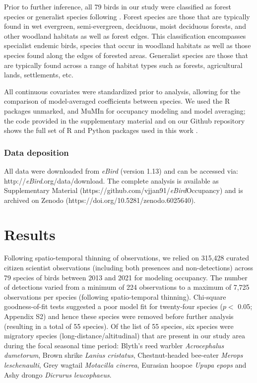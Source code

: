 Prior to further inference, all 79 birds in our study were classified as forest species or generalist species following \citep{ali1983}.
Forest species are those that are typically found in wet evergreen, semi-evergreen, deciduous, moist deciduous forests, and other woodland habitats as well as forest edges.
This classification encompasses specialist endemic birds, species that occur in woodland habitats as well as those species found along the edges of forested areas.
Generalist species are those that are typically found across a range of habitat types such as forests, agricultural lands, settlements, etc.

All continuous covariates were standardized prior to analysis, allowing for the comparison of model-averaged coefficients between species.
We used the R packages unmarked, and MuMIn for occupancy modeling and model averaging; the code provided in the supplementary material and on our Github repository shows the full set of R and Python packages used in this work \citep{barton2009,fiske2011,r2020}.

\subsubsection*{Data deposition}

All data were downloaded from \textit{eBird} (version 1.13) and can be accessed via: http://\textit{eBird}.org/data/download.
The complete analysis is available as Supplementary Material (https://github.com/vjjan91/\textit{eBird}Occupancy) and is archived on Zenodo (https://doi.org/10.5281/zenodo.6025640).

\section*{Results}

Following spatio-temporal thinning of observations, we relied on 315,428 curated citizen scientist observations (including both presences and non-detections) across 79 species of birds between 2013 and 2021 for modeling occupancy.
The number of detections varied from a minimum of 224 observations to a maximum of 7,725 observations per species (following spatio-temporal thinning).
Chi-square goodness-of-fit tests suggested a poor model fit for twenty-four species ($p <$ 0.05; Appendix S2) and hence these species were removed before further analysis (resulting in a total of 55 species).
Of the list of 55 species, six species were migratory species (long-distance/altitudinal) that are present in our study area during the focal seasonal time period: Blyth's reed warbler \textit{Acrocephalus dumetorum}, Brown shrike \textit{Lanius cristatus}, Chestnut-headed bee-eater \textit{Merops leschenaulti}, Grey wagtail \textit{Motacilla cinerea}, Eurasian hoopoe \textit{Upupa epops} and Ashy drongo \textit{Dicrurus leucophaeus}.

